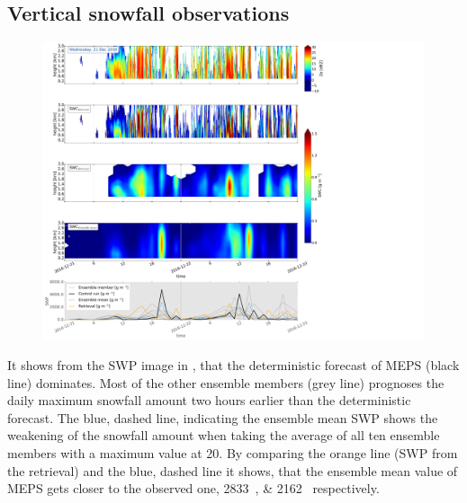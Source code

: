 \subsection{Vertical snowfall observations}\label{sec:vertEM09:2112}
\begin{figure}[t]
	\centering
	\includegraphics[trim={0.4cm .4cm 31.3cm 63.5cm},clip,width=\textwidth]{./fig_SWC/20161221}
	\caption{}\label{fig:SWP21}
\end{figure}
It shows from the SWP image in , that the deterministic forecast of MEPS (black line) dominates. Most of the other ensemble members (grey line) prognoses the daily maximum snowfall amount two hours earlier than the deterministic forecast. The blue, dashed line, indicating the ensemble mean SWP shows the weakening of the snowfall amount when taking the average of all ten ensemble members with a maximum value at \SI{20}{\UTC}. By comparing the orange line (SWP from the retrieval) and the blue, dashed line it shows, that the ensemble mean value of MEPS gets closer to the observed one, \SIlist{2833; 2162}{\SWP} respectively.
%
